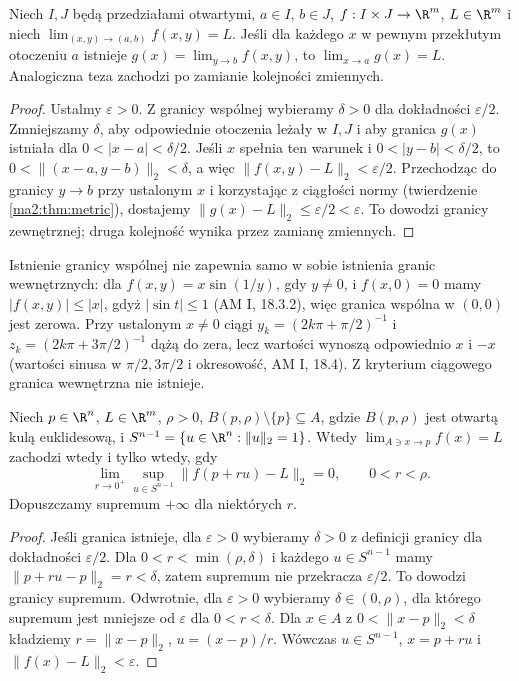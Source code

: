 \begin{twierdzenie}
\label{ma2:thm:iterated-limit}
Niech $I,J$ będą przedziałami otwartymi, $a\in I$, $b\in J$,
$f:I\times J\to\R^m$, $L\in\R^m$ i niech
$\lim_{(x,y)\to(a,b)}f(x,y)=L$.
Jeśli dla każdego $x$ w pewnym przekłutym otoczeniu $a$
istnieje $g(x)=\lim_{y\to b}f(x,y)$, to
$\lim_{x\to a}g(x)=L$. Analogiczna teza zachodzi po zamianie
kolejności zmiennych.
\end{twierdzenie}
\begin{proof}
Ustalmy $\varepsilon>0$. Z granicy wspólnej wybieramy
$\delta>0$ dla dokładności $\varepsilon/2$.
Zmniejszamy $\delta$, aby odpowiednie otoczenia leżały
w $I,J$ i aby granica $g(x)$ istniała dla
$0<|x-a|<\delta/2$. Jeśli $x$ spełnia ten warunek
i $0<|y-b|<\delta/2$, to
$0<\|(x-a,y-b)\|_2<\delta$, a więc
$\|f(x,y)-L\|_2<\varepsilon/2$.
Przechodząc do granicy $y\to b$ przy ustalonym $x$
i korzystając z ciągłości normy (twierdzenie
\ref{ma2:thm:metric}), dostajemy
$\|g(x)-L\|_2\le\varepsilon/2<\varepsilon$.
To dowodzi granicy zewnętrznej; druga kolejność
wynika przez zamianę zmiennych.
\end{proof}

Istnienie granicy wspólnej nie zapewnia samo w sobie
istnienia granic wewnętrznych: dla $f(x,y)=x\sin(1/y)$,
gdy $y\ne0$, i $f(x,0)=0$ mamy
$|f(x,y)|\le |x|$, gdyż $|\sin t|\le1$
(AM I, 18.3.2), więc granica wspólna w $(0,0)$
jest zerowa. Przy ustalonym $x\ne0$ ciągi
$y_k=(2k\pi+\pi/2)^{-1}$ i
$z_k=(2k\pi+3\pi/2)^{-1}$ dążą do zera, lecz wartości
wynoszą odpowiednio $x$ i $-x$ (wartości sinusa
w $\pi/2,3\pi/2$ i okresowość, AM I, 18.4).
Z kryterium ciągowego granica wewnętrzna nie istnieje.

\begin{twierdzenie}
\label{ma2:thm:radial-limit}
Niech $p\in\R^n$, $L\in\R^m$, $\rho>0$,
$B(p,\rho)\setminus\{p\}\subseteq A$, gdzie $B(p,\rho)$
jest otwartą kulą euklidesową, i
$S^{n-1}=\{u\in\R^n:\|u\|_2=1\}$.
Wtedy $\lim_{A\ni x\to p}f(x)=L$ zachodzi wtedy
i tylko wtedy, gdy
\[
 \lim_{r\to0^+}\sup_{u\in S^{n-1}}\|f(p+ru)-L\|_2=0,
 \qquad 0<r<\rho.
\]
Dopuszczamy supremum $+\infty$ dla niektórych $r$.
\end{twierdzenie}
\begin{proof}
Jeśli granica istnieje, dla $\varepsilon>0$ wybieramy
$\delta>0$ z definicji granicy dla dokładności $\varepsilon/2$.
Dla $0<r<\min(\rho,\delta)$ i każdego $u\in S^{n-1}$
mamy $\|p+ru-p\|_2=r<\delta$, zatem supremum nie przekracza
$\varepsilon/2$. To dowodzi granicy supremum.
Odwrotnie, dla $\varepsilon>0$ wybieramy $\delta\in(0,\rho)$,
dla którego supremum jest mniejsze od $\varepsilon$ dla
$0<r<\delta$. Dla $x\in A$ z $0<\|x-p\|_2<\delta$
kładziemy $r=\|x-p\|_2$, $u=(x-p)/r$.
Wówczas $u\in S^{n-1}$, $x=p+ru$ i
$\|f(x)-L\|_2<\varepsilon$.
\end{proof}

